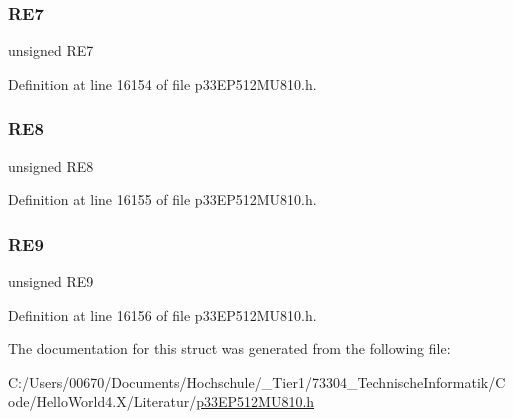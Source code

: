\mbox{\label{structtag_p_o_r_t_e_b_i_t_s_aa727886dd6491fb841ca0bb362344c65}} 
\subsubsection{\texorpdfstring{R\+E7}{RE7}}
{\footnotesize\ttfamily unsigned R\+E7}



Definition at line 16154 of file p33\+E\+P512\+M\+U810.\+h.

\mbox{\label{structtag_p_o_r_t_e_b_i_t_s_a6ee18605deb04aab7975dd55c1382a03}} 
\subsubsection{\texorpdfstring{R\+E8}{RE8}}
{\footnotesize\ttfamily unsigned R\+E8}



Definition at line 16155 of file p33\+E\+P512\+M\+U810.\+h.

\mbox{\label{structtag_p_o_r_t_e_b_i_t_s_a7d4c4c6a5f7e90ac8b1924e28beccd7b}} 
\subsubsection{\texorpdfstring{R\+E9}{RE9}}
{\footnotesize\ttfamily unsigned R\+E9}



Definition at line 16156 of file p33\+E\+P512\+M\+U810.\+h.



The documentation for this struct was generated from the following file\+:\begin{DoxyCompactItemize}
\item 
C\+:/\+Users/00670/\+Documents/\+Hochschule/\+\_\+\+Tier1/73304\+\_\+\+Technische\+Informatik/\+Code/\+Hello\+World4.\+X/\+Literatur/\hyperlink{p33_e_p512_m_u810_8h}{p33\+E\+P512\+M\+U810.\+h}\end{DoxyCompactItemize}
